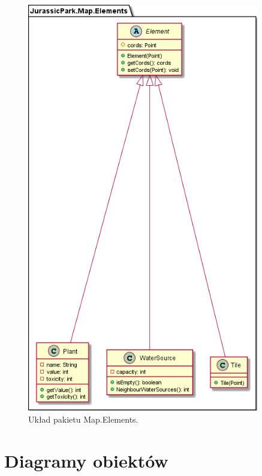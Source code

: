 \begin{figure}[h!]
\begin{minipage}{0.45\textwidth}
        \includegraphics[width=0.9\textwidth]{images/class/elements.png} %
        \caption{Układ pakietu Map.Elements.}
    \end{minipage}
\end{figure}

\newpage
\section{Diagramy obiektów}

